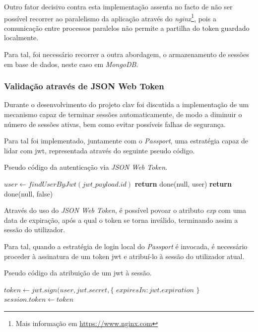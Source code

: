 Outro fator decisivo contra esta implementação assenta no facto de não ser possível recorrer ao paralelismo da aplicação através do \emph{nginx}\footnote{Mais informação em \url{https://www.nginx.com}}, pois a comunicação entre processos paralelos não permite a partilha do token guardado localmente.

Para tal, foi necessário recorrer a outra abordagem, o armazenamento de sessões em base de dados, neste caso em \emph{MongoDB}.

\subsubsection{Validação através de JSON Web Token} \label{jwt_1}

Durante o desenvolvimento do projeto \gls{clav} foi discutida a implementação de um mecanismo capaz de terminar sessões automaticamente, de modo a diminuir o número de sessões ativas, bem como evitar possíveis falhas de segurança.

Para tal foi implementado, juntamente com o \emph{Passport}, uma estratégia capaz de lidar com \gls{jwt}, representada através do seguinte pseudo código.

\begin{algorithm}
    \caption{Pseudo código da autenticação via \emph{JSON Web Token}.}
    \begin{algorithmic}[1]
        \State $user \gets findUserByJwt(jwt\_payload.id)$
            \State \textbf{return} done(null, user)
        \Else
            \State \textbf{return} done(null, false)
        \EndIf
    \EndFunction
    \end{algorithmic}
\end{algorithm}

Através do uso do \emph{JSON Web Token}, é possível povoar o atributo \emph{exp} com uma data de expiração, após a qual o token se torna inválido, terminando assim a sessão do utilizador.

Para tal, quando a estratégia de login local do \emph{Passport} é invocada, é necessário proceder à assinatura de um token \gls{jwt} e atribuí-lo à sessão do utilizador atual.

\begin{algorithm}
    \caption{Pseudo código da atribuição de um \gls{jwt} à sessão.}
    \begin{algorithmic}[1]
        \State $token \gets jwt.sign({user}, jwt.secret, \{$
        \State \indent $expiresIn : jwt.expiration$
        \State $\}$
        \State $session.token \gets token$
    \EndFunction
    \end{algorithmic}
\end{algorithm}

